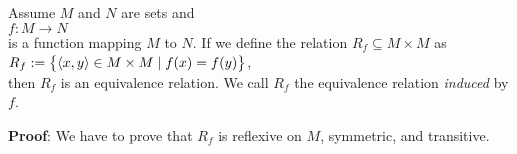 \begin{Proposition} Assume $M$ and $N$ are sets and
\\[0.2cm]
\hspace*{1.3cm}
$f : M \rightarrow N$
\\[0.2cm]
is a function mapping $M$ to $N$.  If we define the  relation $R_f \subseteq M \times M$ as
\\[0.2cm]
\hspace*{1.3cm}
$R_f := \bigl\{ \pair(x,y) \in M \times M \mid f(x) = f(y) \bigr\}$,
\\[0.2cm]
then $R_f$ is an equivalence relation.  We call $R_f$ the equivalence relation \emph{induced}
by $f$.
\end{Proposition}

\noindent
\textbf{Proof}: We have to prove that $R_f$ is reflexive on $M$, symmetric, and transitive.
